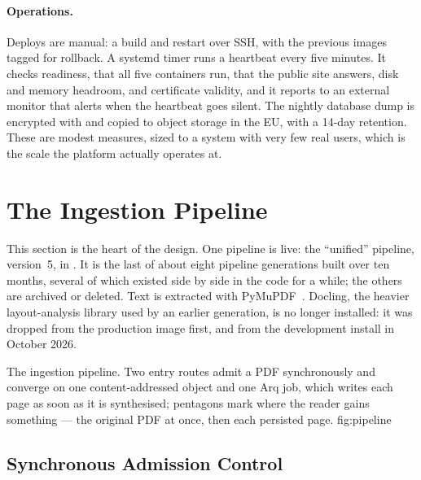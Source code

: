 \paragraph{Operations.}
Deploys are manual: a build and restart over SSH, with the previous images
tagged for rollback. A systemd timer runs a heartbeat every five minutes. It
checks readiness, that all five containers run, that the public site answers,
disk and memory headroom, and certificate validity, and it reports to an
external monitor that alerts when the heartbeat goes silent. The nightly
database dump is encrypted with  and copied to object storage in the
EU, with a 14-day retention. These are modest measures, sized to a system with
very few real users, which is the scale the platform actually operates at.

\section{The Ingestion Pipeline}
\label{sec:pipeline}

This section is the heart of the design. One pipeline is live: the ``unified''
pipeline, version~5, in .
It is the last of about eight pipeline generations built over ten months, several
of which existed side by side in the code for a while; the others are archived
or deleted. Text is extracted with PyMuPDF~\cite{pymupdf}. Docling, the heavier
layout-analysis library used by an earlier generation, is no longer installed:
it was dropped from the production image first, and from the development
install in October 2026.

  {The ingestion pipeline. Two entry routes admit a PDF synchronously and
   converge on one content-addressed object and one Arq job, which writes each
   page as soon as it is synthesised; pentagons mark where the reader gains
   something --- the original PDF at once, then each persisted page.}
  {fig:pipeline}

\subsection{Synchronous Admission Control}
\label{sec:admission}

